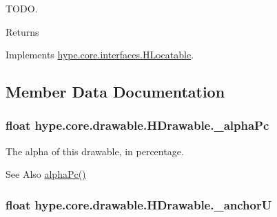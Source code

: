 T\-O\-D\-O. 

\begin{DoxyReturn}{Returns}

\end{DoxyReturn}


Implements \hyperlink{interfacehype_1_1core_1_1interfaces_1_1_h_locatable_a39eb12015a40fe494f789607dec9c484}{hype.\-core.\-interfaces.\-H\-Locatable}.



\subsection{Member Data Documentation}
\hypertarget{classhype_1_1core_1_1drawable_1_1_h_drawable_a7aafa34986a8a27053d5298608b53a94}{
\subsubsection[{\-\_\-alpha\-Pc}]{\setlength{\rightskip}{0pt plus 5cm}float hype.\-core.\-drawable.\-H\-Drawable.\-\_\-alpha\-Pc\hspace{0.3cm}{\ttfamily [protected]}}}\label{classhype_1_1core_1_1drawable_1_1_h_drawable_a7aafa34986a8a27053d5298608b53a94}


The alpha of this drawable, in percentage. 

\begin{DoxySeeAlso}{See Also}
\hyperlink{classhype_1_1core_1_1drawable_1_1_h_drawable_a3be1ca0802560e21622875604b0da0ff}{alpha\-Pc()} 
\end{DoxySeeAlso}
\hypertarget{classhype_1_1core_1_1drawable_1_1_h_drawable_a57c2089cf2b6d7621844cbc9814c3e51}{
\subsubsection[{\-\_\-anchor\-U}]{\setlength{\rightskip}{0pt plus 5cm}float hype.\-core.\-drawable.\-H\-Drawable.\-\_\-anchor\-U\hspace{0.3cm}{\ttfamily [protected]}}}\label{classhype_1_1core_1_1drawable_1_1_h_drawable_a57c2089cf2b6d7621844cbc9814c3e51}


